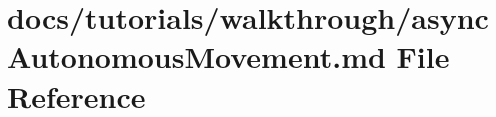 \hypertarget{asyncAutonomousMovement_8md}{}\section{docs/tutorials/walkthrough/async\+Autonomous\+Movement.md File Reference}
\label{asyncAutonomousMovement_8md}
